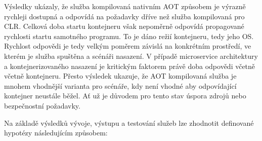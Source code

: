 Výsledky ukázaly, že služba kompilovaná nativním AOT způsobem je výrazně rychleji dostupná a odpovídá na požadavky dříve než služba kompilovaná pro CLR. Celková doba startu kontejneru však nepoměrně odpovídá propagované rychlosti startu samotného programu. To je dáno režií kontejneru, tedy jeho OS. Rychlost odpovědi je tedy velkým poměrem závislá na konkrétním prostředí, ve kterém je služba spuštěna a scénáři nasazení. V případě microservice architektury a kontejnerizovaného nasazení je kritickým faktorem právě doba odpovědi včetně včetně kontejneru. Přesto výsledek ukazuje, že AOT kompilovaná služba je mnohem vhodnější varianta pro scénáře, kdy není vhodné aby odpovídající kontejner neustále běžel. Ať už je důvodem pro tento stav úspora zdrojů nebo bezpečnostní požadavky.


Na základě výsledků vývoje, výstupu a testování služeb lze zhodnotit definované hypotézy následujícím způsobem:


